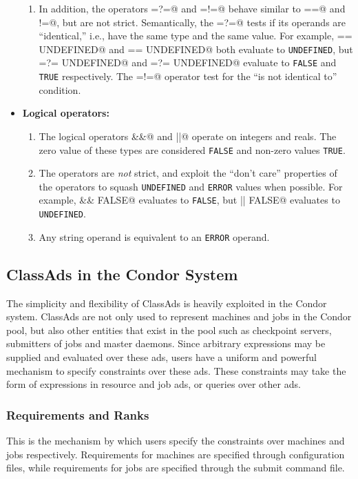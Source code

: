 \begin{itemize}
\begin{enumerate}
		\item In addition, the operators \verb@=?=@ and \verb@=!=@ behave
		similar to \verb@==@ and \verb@!=@, but are not strict.  Semantically,
		the \verb@=?=@ tests if its operands are ``identical,'' i.e., have
		the same type and the same value.  For example,  == UNDEFINED@ 
		and \verb@UNDEFINED == UNDEFINED@ both evaluate to \texttt{UNDEFINED},
		but  =?= UNDEFINED@ and \verb@UNDEFINED =?= UNDEFINED@ 
		evaluate to \texttt{FALSE} and \texttt{TRUE} respectively.  The
		\verb@=!=@ operator test for the ``is not identical to'' condition.
	\end{enumerate}

	\item\textbf{Logical operators:}
	\begin{enumerate}
		\item The logical operators \verb@&&@ and \verb@||@ operate on 
		integers and reals.  The zero value of these types are considered 
		\texttt{FALSE} and non-zero values \texttt{TRUE}.

		\item The operators are \emph{not} strict, and exploit the 
		``don't care'' properties of the operators to squash \texttt{UNDEFINED}
		and \texttt{ERROR} values when possible.  For example,
		\verb@UNDEFINED && FALSE@ evaluates to \texttt{FALSE}, but	
		\verb@UNDEFINED || FALSE@ evaluates to \texttt{UNDEFINED}.

		\item Any string operand is equivalent to an \texttt{ERROR} operand.
	\end{enumerate}
\end{itemize}

\subsection{ClassAds in the Condor System}
The simplicity and flexibility of ClassAds is heavily exploited in the Condor
system.  ClassAds are not only used to represent machines and jobs in the 
Condor pool, but also other entities that exist in the pool such as 
checkpoint servers, submitters of jobs and master daemons.  Since arbitrary
expressions may be supplied and evaluated over these ads, users have a uniform
and powerful mechanism to specify constraints over these ads.  These constraints
may take the form of  expressions in resource and job ads,
or queries over other ads.

\subsubsection{Requirements and Ranks}
This is the mechanism by which users specify the constraints over machines
and jobs respectively.  Requirements for machines are specified through
configuration files, while requirements for jobs are specified through the
submit command file.

